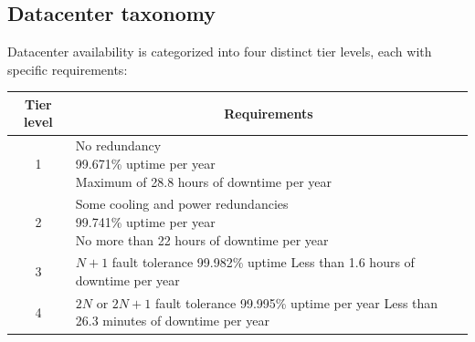 \subsection{Datacenter taxonomy}
Datacenter availability is categorized into four distinct tier levels, each with specific requirements:
\begin{table}[H]
    \centering
    \begin{tabular}{|c|l|}
    \hline
    Tier level & \multicolumn{1}{c|}{Requirements} \\ \hline
    1          & \makecell[l]{No redundancy \\ 99.671\% uptime per year \\ Maximum of 28.8 hours of downtime per year }                                 \\\hline
    2          & \makecell[l]{Some cooling and power redundancies \\ 99.741\% uptime per year \\ No more than 22 hours of downtime per year}    \\\hline
    3          & \makecell[l]{$N+1$ fault tolerance \\ 99.982\% uptime \\ Less than 1.6 hours of downtime per year} \\\hline
    4          & \makecell[l]{$2N$ or $2N+1$ fault tolerance \\ 99.995\% uptime per year \\ Less than 26.3 minutes of downtime per year}                                 \\ \hline
    \end{tabular}
\end{table}